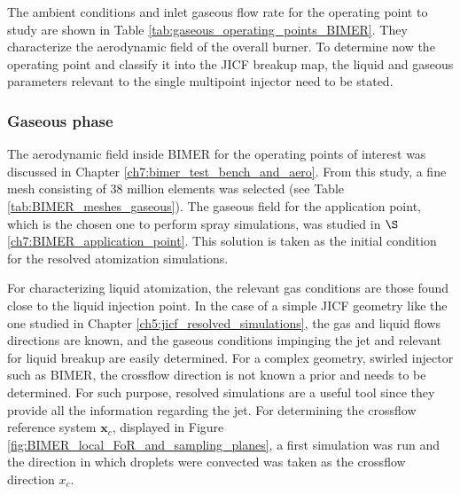 The ambient conditions and inlet gaseous flow rate for the operating point to study are shown in Table \ref{tab:gaseous_operating_points_BIMER}. They characterize the aerodynamic field of the overall burner. To determine now the operating point and classify it into the JICF breakup map, the liquid and gaseous parameters relevant to the single multipoint injector need to be stated.


\subsubsection*{Gaseous phase}



The aerodynamic field inside BIMER for the operating points of interest was discussed in Chapter \ref{ch7:bimer_test_bench_and_aero}. From this study, a fine mesh consisting of 38 million elements was selected (see Table \ref{tab:BIMER_meshes_gaseous}). The gaseous field for the application point, which is the chosen one to perform spray simulations, was studied in $\S$\ref{ch7:BIMER_application_point}. This solution is taken as the initial condition for the resolved atomization simulations.

For characterizing liquid atomization, the relevant gas conditions are those found close to the liquid injection point. In the case of a simple JICF geometry like the one studied in Chapter \ref{ch5:jicf_resolved_simulations}, the gas and liquid flows directions are known, and the gaseous conditions impinging the jet and relevant for liquid breakup are easily determined. For a complex geometry, swirled injector such as BIMER, the crossflow direction is not known a prior and needs to be determined. For such purpose, resolved simulations are a useful tool since they provide all the information regarding the jet. For determining the crossflow reference system $\textbf{x}_c$, displayed in Figure \ref{fig:BIMER_local_FoR_and_sampling_planes},  a first simulation was run and the direction in which droplets were convected was taken as the crossflow direction $x_c$. 

